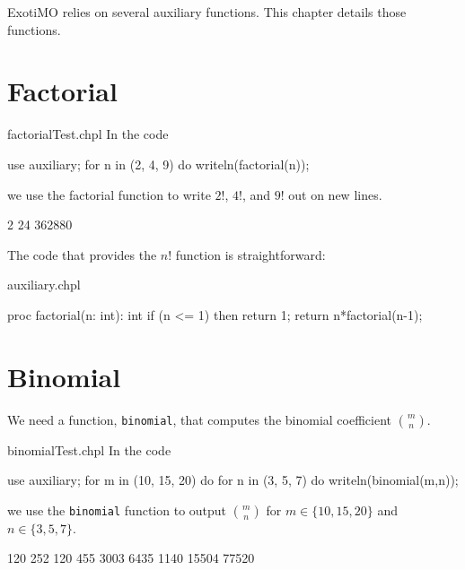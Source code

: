 \label{Auxiliary_Functions}

ExotiMO relies on several auxiliary functions. This chapter details those functions.

\section{Factorial}

\begin{chapeltest}{factorialTest.chpl}
In the code
\begin{chapelpre}
\end{chapelpre}
\begin{chapel}
use auxiliary;
for n in (2, 4, 9) do
  writeln(factorial(n));
\end{chapel}
we use the factorial function to write $2!$, $4!$, and $9!$ out on new lines.
\begin{chapelpost}
\end{chapelpost}
\begin{chapeloutput}
2
24
362880
\end{chapeloutput}
\end{chapeltest}

The code that provides the $n!$ function is straightforward:
\begin{chapelsource}{auxiliary.chpl}
\begin{chapel}
proc factorial(n: int): int{
  if (n <= 1) then return 1;
  return n*factorial(n-1);
}
\end{chapel}
\end{chapelsource}

\section{Binomial}

We need a function, \lstinline{binomial}, that computes the binomial coefficient $\binom{m}{n}$.
\begin{chapeltest}{binomialTest.chpl}
In the code
\begin{chapelpre}
\end{chapelpre}
\begin{chapel}
use auxiliary;
for m in (10, 15, 20) do {
  for n in (3, 5, 7) do {
    writeln(binomial(m,n));
  }
}
\end{chapel}
we use the \lstinline{binomial} function to output $\binom{m}{n}$ 
for $m\in\{10, 15, 20\}$ and $n \in \{3, 5, 7\}$.
\begin{chapelpost}
\end{chapelpost}
\begin{chapeloutput}
120
252
120
455
3003
6435
1140
15504
77520
\end{chapeloutput}
\end{chapeltest}

